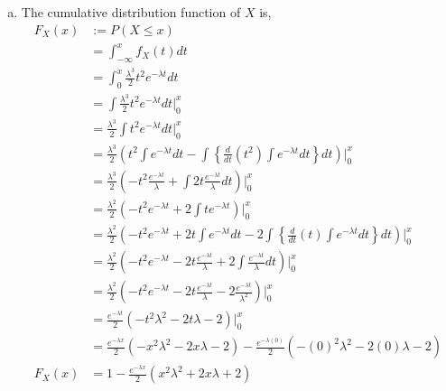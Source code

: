 \documentclass[answers]{exam}
\begin{document}
\begin{questions}
\begin{framed}
\begin{enumerate}[(a)]
            \item The cumulative distribution function of $X$ is,
                  \begin{equation*}
                      \begin{split}
                          F_{X}(x)&:=P(X\le x)\\
                          & = \int_{-\infty}^{x}f_{X}(t)dt\\
                          & = \int_{0}^{x}\frac{\lambda^3}{2}t^2 e^{-\lambda t}dt\\
                          & = \int\frac{\lambda^3}{2}t^2 e^{-\lambda t}dt\bigg|_{0}^{x}\\
                          & = \frac{\lambda^3}{2}\int t^2 e^{-\lambda t}dt\bigg|_{0}^{x}\\
                          & = \frac{\lambda^3}{2}\left(t^2\int e^{-\lambda t}dt-\int \left\{\frac{d}{dt}(t^2)\int e^{-\lambda t}dt\right\}dt\right)\bigg|_{0}^{x}\\
                          & = \frac{\lambda^3}{2}\left(-t^2 \frac{e^{-\lambda t}}{\lambda}+\int 2t\frac{e^{-\lambda t}}{\lambda}dt\right)\bigg|_{0}^{x}\\
                          & = \frac{\lambda^2}{2}\left(-t^2e^{-\lambda t}+2\int te^{-\lambda t}\right)\bigg|_{0}^{x}\\
                          & = \frac{\lambda^2}{2}\left(-t^2e^{-\lambda t}+2t\int e^{-\lambda t}dt-2\int \left\{\frac{d}{dt}(t)\int e^{-\lambda t}dt\right\}dt\right)\bigg|_{0}^{x}\\
                          & = \frac{\lambda^2}{2}\left(-t^2e^{-\lambda t}-2t\frac{e^{-\lambda t}}{\lambda}+2\int \frac{e^{-\lambda t}}{\lambda} dt\right)\bigg|_{0}^{x}\\
                          & = \frac{\lambda^2}{2}\left(-t^2e^{-\lambda t}-2t\frac{e^{-\lambda t}}{\lambda}-2\frac{e^{-\lambda t}}{\lambda^2}\right)\bigg|_{0}^{x}\\
                          & = \frac{e^{-\lambda t}}{2}\left(-t^2\lambda^2-2t\lambda-2\right)\bigg|_{0}^{x}\\
                          & = \frac{e^{-\lambda x}}{2}\left(-x^2\lambda^2-2x\lambda-2\right)-\frac{e^{-\lambda (0)}}{2}\left(-(0)^2\lambda^2-2(0)\lambda-2\right)\\
                          F_{X}(x) & = 1-\frac{e^{-\lambda x}}{2}\left(x^2\lambda^2+2x\lambda+2\right)
                      \end{split}
                  \end{equation*}

\end{enumerate}
\end{framed}
\end{questions}
\end{document}
